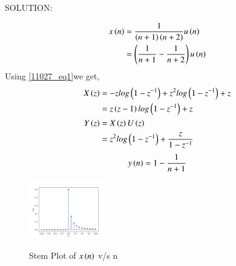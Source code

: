 \documentclass[journal,12pt,twocolumn]{IEEEtran}
\theoremstyle{remark}
\begin{document}
SOLUTION:
\begin{table}[ht]

\end{table}
\begin{align}
x\left(n\right) &= \frac{1}{\left(n+1\right)\left(n+2\right)}u\left(n\right)\\
& = \left(\frac{1}{n+1} - \frac{1}{n+2}\right)u\left(n\right)\\
\end{align}
Using \eqref{11027_eq1}we get,
\begin{align}X\left(z\right) &= -z log\left(1-z^{-1}\right) + z^2 log\left(1-z^{-1}\right) + z\\
&= z\left(z-1\right)log\left(1-z^{-1}\right) + z\\
    Y\left(z\right) &= X\left(z\right)U\left(z\right)\\
     &=z^2log\left(1-z^{-1}\right) + \frac{z}{1-z^{-1}} \\
\end{align}
\begin{align}
    y\left(n\right) &= 1 - \frac{1}{n+1}\\
\end{align}
\begin{figure}[h]
    \includegraphics[width=0.3\textwidth]{figs/x(n)_plot.png}\label{fig:stem-plot}
    \caption{Stem Plot of $x\left(n\right)$ v/s n}
\end{figure}
\end{document}
